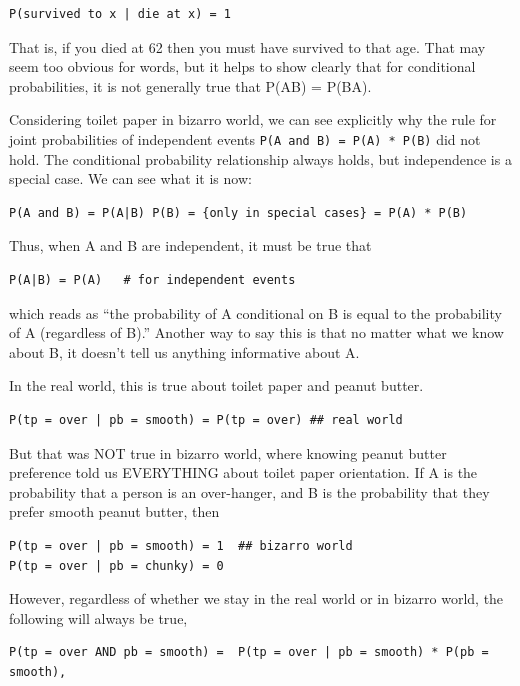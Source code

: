 \documentclass[openany]{book}
\begin{document}
\begin{verbatim}
P(survived to x | die at x) = 1
\end{verbatim}

That is, if you died at 62 then you must have survived to that age. That may seem too obvious for words, but it helps to show clearly that for conditional probabilities, it is not generally true that P(A\textbar{}B) = P(B\textbar{}A).

Considering toilet paper in bizarro world, we can see explicitly why the rule for joint probabilities of independent events \texttt{P(A\ and\ B)\ =\ P(A)\ *\ P(B)} did not hold. The conditional probability relationship always holds, but independence is a special case. We can see what it is now:

\begin{verbatim}
P(A and B) = P(A|B) P(B) = {only in special cases} = P(A) * P(B)
\end{verbatim}

Thus, when A and B are independent, it must be true that

\begin{verbatim}
P(A|B) = P(A)   # for independent events
\end{verbatim}

which reads as ``the probability of A conditional on B is equal to the probability of A (regardless of B).'' Another way to say this is that no matter what we know about B, it doesn't tell us anything informative about A.

In the real world, this is true about toilet paper and peanut butter.

\begin{verbatim}
P(tp = over | pb = smooth) = P(tp = over) ## real world
\end{verbatim}

But that was NOT true in bizarro world, where knowing peanut butter preference told us EVERYTHING about toilet paper orientation. If A is the probability that a person is an over-hanger, and B is the probability that they prefer smooth peanut butter, then

\begin{verbatim}
P(tp = over | pb = smooth) = 1  ## bizarro world
P(tp = over | pb = chunky) = 0
\end{verbatim}

However, regardless of whether we stay in the real world or in bizarro world, the following will always be true,

\begin{verbatim}
P(tp = over AND pb = smooth) =  P(tp = over | pb = smooth) * P(pb = smooth),
\end{verbatim}
\end{document}
